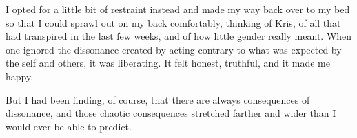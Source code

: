 I opted for a little bit of restraint instead and made my way back over to my bed so that I could sprawl out on my back comfortably, thinking of Kris, of all that had transpired in the last few weeks, and of how little gender really meant.  When one ignored the dissonance created by acting contrary to what was expected by the self and others, it was liberating.  It felt honest, truthful, and it made me happy.

But I had been finding, of course, that there are always consequences of dissonance, and those chaotic consequences stretched farther and wider than I would ever be able to predict.
